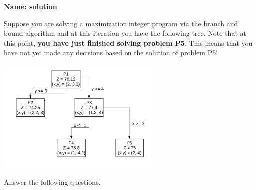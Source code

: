 \documentclass[letterpaper,oneside,12pt]{article}%
\newcommand{\blu}{\color{blue}}
\begin{document}
\noindent{}

\vspace{3mm} \hspace{\fill} \textbf{Name: {\blu solution}}

Suppose you are solving a maximization integer program via the branch and bound algorithm and at this iteration you have the following tree. Note that at this point, \textbf{you have just finished solving problem P5}. This means that you have not yet made any decisions based on the solution of problem P5!

\begin{center}
\includegraphics[width=0.60\textwidth]{B&B_example.png}
\end{center}

Answer the following questions.
\end{document}
